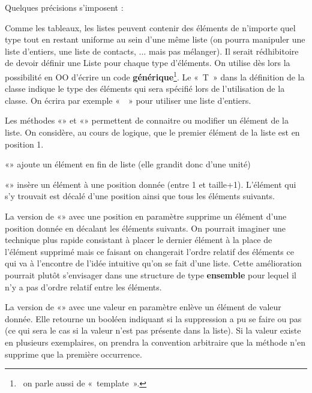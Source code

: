 \bigskip

Quelques précisions s’imposent :

\begin{liste}
	\item 
		Comme les tableaux, les listes peuvent contenir des éléments de
		n’importe quel type tout en restant uniforme au sein d’une même liste
		(on pourra manipuler une liste d’entiers, une liste de contacts, ...
		mais pas mélanger). Il serait rédhibitoire de devoir définir une Liste
		pour chaque type d’éléments. On utilise dès lors la possibilité en OO
		d’écrire un code \textbf{générique}\footnote{\ on parle aussi de
		«~template~».}. Le «~T~» dans la définition de la classe indique le
		type des éléments qui sera spécifié lors de l’utilisation de la classe.
		On écrira par exemple «~~» pour
		utiliser une liste d’entiers.
	\item 
		Les méthodes «» et «»
		permettent de connaitre ou modifier un élément de la liste. On
		considère, au cours de logique, que le premier élément de 
		la liste est en position 1.
	\item 
		«» ajoute un élément en fin de liste (elle
		grandit donc d’une unité)
	\item 
		«» insère un élément à une position donnée
		(entre 1 et taille+1). L’élément qui s’y trouvait est décalé
		d'une position ainsi que tous les éléments suivants.
	\item 
		La version de «» avec une position en
		paramètre supprime un élément d'une position donnée en
		décalant les éléments suivants. On pourrait imaginer une technique plus
		rapide consistant à placer le dernier élément à la place de l’élément
		supprimé mais ce faisant on changerait l’ordre relatif des éléments ce
		qui va à l’encontre de l’idée intuitive qu’on se fait d’une liste.
		Cette amélioration pourrait plutôt s’envisager dans une structure de
		type \textbf{ensemble} pour lequel il n’y a pas d’ordre relatif entre
		les éléments.
	\item 
		La version de «» avec une valeur en
		paramètre enlève un élément de valeur donnée. Elle retourne un booléen
		indiquant si la suppression a pu se faire ou pas (ce qui sera le cas si
		la valeur n’est pas présente dans la liste). Si la valeur existe en
		plusieurs exemplaires, on prendra la convention arbitraire que
		la méthode n’en supprime que la première	occurrence.

\end{liste}
